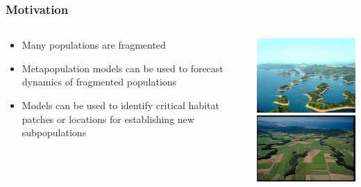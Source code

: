 \documentclass[color=usenames,dvipsnames]{beamer}\usepackage[]{graphicx}\usepackage[]{color}
\begin{document}
\begin{frame}
  \frametitle{Motivation}
  \large
  \begin{columns}
    \begin{column}{0.6\textwidth}
      \begin{itemize}[<+->]
        \item Many populations are fragmented
        \item Metapopulation models can be used to forecast dynamics of
          fragmented populations
        \item Models can be used to identify critical habitat patches or
          locations for establishing new subpopulations
      \end{itemize}
    \end{column}
    \begin{column}{0.4\textwidth}
      \includegraphics[width=\textwidth]{figs/ping-ding} \\
      \vspace{1cm}
      \includegraphics[width=\textwidth]{figs/fragmentation} \par
    \end{column}
  \end{columns}
\end{frame}
\end{document}
